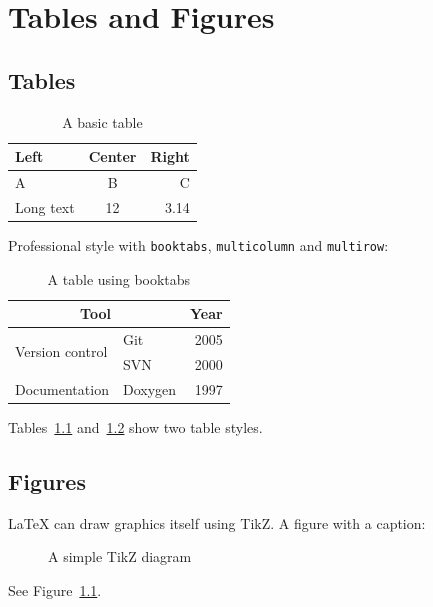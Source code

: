 \chapter{Tables and Figures}

\section{Tables}
\begin{table}[h]
\centering
\begin{tabular}{|l|c|r|}
\hline
\textbf{Left} & \textbf{Center} & \textbf{Right} \\ \hline
A & B & C \\ \hline
Long text & 12 & 3.14 \\ \hline
\end{tabular}
\caption{A basic table}
\label{tab:basic}
\end{table}

Professional style with \texttt{booktabs}, \texttt{multicolumn} and \texttt{multirow}:
\begin{table}[h]
\centering
\begin{tabular}{llr}
\toprule
\multicolumn{2}{c}{\textbf{Tool}} & \textbf{Year} \\
\midrule
\multirow{2}{*}{Version control} & Git & 2005 \\
                                 & SVN & 2000 \\
Documentation & Doxygen & 1997 \\
\bottomrule
\end{tabular}
\caption{A table using booktabs}
\label{tab:booktabs}
\end{table}
Tables~\ref{tab:basic} and~\ref{tab:booktabs} show two table styles.

\section{Figures}
\LaTeX{} can draw graphics itself using TikZ. A figure with a caption:
\begin{figure}[h]
\centering
{}
\caption{A simple TikZ diagram}
\label{fig:tikz}
\end{figure}
See Figure~\ref{fig:tikz}.

